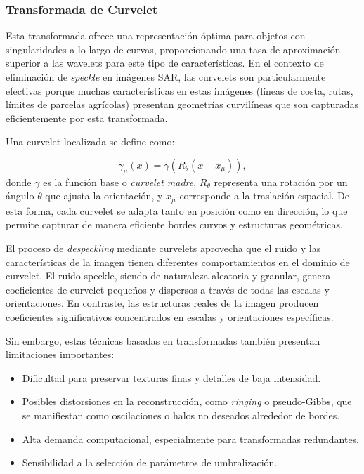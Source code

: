 \subsubsection{Transformada de Curvelet}

Esta transformada \cite{starck2002curvelet} ofrece una representación óptima para objetos con singularidades a lo largo de curvas, proporcionando una tasa de aproximación superior a las wavelets para este tipo de características. En el contexto de eliminación de \emph{speckle} en imágenes SAR, las curvelets son particularmente efectivas porque muchas características en estas imágenes (líneas de costa, rutas, límites de parcelas agrícolas) presentan geometrías curvilíneas que son capturadas eficientemente por esta transformada.

Una curvelet localizada se define como:

\begin{equation}
	\gamma_{\mu}(x) = \gamma(R_\theta(x - x_\mu)),
\end{equation}
donde $\gamma$ es la función base o \emph{curvelet madre}, $R_\theta$ representa una rotación por un ángulo $\theta$ que ajusta la orientación, y $x_\mu$ corresponde a la traslación espacial. De esta forma, cada curvelet se adapta tanto en posición como en dirección, lo que permite capturar de manera eficiente bordes curvos y estructuras geométricas.

El proceso de \emph{despeckling} mediante curvelets aprovecha que el ruido y las características de la imagen tienen diferentes comportamientos en el dominio de curvelet. El ruido speckle, siendo de naturaleza aleatoria y granular, genera coeficientes de curvelet pequeños y dispersos a través de todas las escalas y orientaciones. En contraste, las estructuras reales de la imagen producen coeficientes significativos concentrados en escalas y orientaciones específicas. 

Sin embargo, estas técnicas basadas en transformadas también presentan limitaciones importantes:
\begin{itemize}
	\item Dificultad para preservar texturas finas y detalles de baja intensidad.
	\item Posibles distorsiones en la reconstrucción, como \emph{ringing} o pseudo-Gibbs, que se manifiestan como oscilaciones o halos no deseados alrededor de bordes.
	\item Alta demanda computacional, especialmente para transformadas redundantes.
	\item Sensibilidad a la selección de parámetros de umbralización.
\end{itemize}

